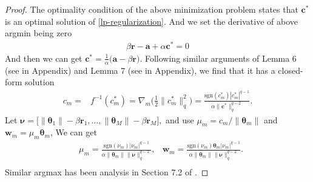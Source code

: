 \documentclass{article}
\newtheorem{lemma}{Lemma}
\begin{document}
\begin{proof}
The optimality condition of the above minimization problem \cite{rockafellar2015convex} states that $\pmb{c}^\ast$ is an optimal solution of \eqref{lp-regularization}. And we set the derivative of above argmin being zero
\begin{align}
    \label{l2-regularization-subgradient}
        \beta\mathbf{r}-\mathbf{a}+\alpha\pmb{c}^\ast=0
\end{align}
And then we can get $\pmb{c}^\ast=\frac{1}{\alpha}\Big(\mathbf{a}-\beta\mathbf{r}\Big)$.
Following similar arguments of Lemma 6 (see in Appendix) and Lemma 7 (see in Appendix), we find that it has a closed-form solution
\begin{align*}
    c_m=&f ^{-1}(c_m^\ast)=\nabla_m\Big(\frac{1}{2}\|{c}_m^\ast\|_q^2\Big)
    =\frac{\mathrm{sgn}({c}_m^\ast)|{c}_m^\ast|^{q-1}}{\alpha\|\pmb{c}^\ast\|_q^{q-2}}.
\end{align*}
Let
$
    \bm \nu=\Big[\|\pmb{\theta}_1\|-\beta\mathbf{r}_1,\ldots,
    \|\pmb{\theta}_M\|-\beta\mathbf{r}_M\Big],
$
and use $\mu_m=c_m/\|\pmb{\theta}_m\|$ and $\mathbf w_m=\mu_m\pmb{\theta}_m$, We can get
\begin{align*}
    &{\mu}_m=\frac{\mathrm{sgn}(\nu_m)|\nu_m|^{q-1}}{\alpha\|\pmb{\theta}_m\|\|\bm \nu\|_q^{q-2}},
    &\mathbf w_m=\frac{\mathrm{sgn}(\nu_m)\pmb{\theta}_m|\nu_m|^{q-1}}{\alpha\|\pmb{\theta}_m\|\|\bm \nu\|_q^{q-2}}.\\
\end{align*}
Similar argmax has been analysis in Section 7.2 of \cite{Xiao10}.
\end{proof}

\end{document}
